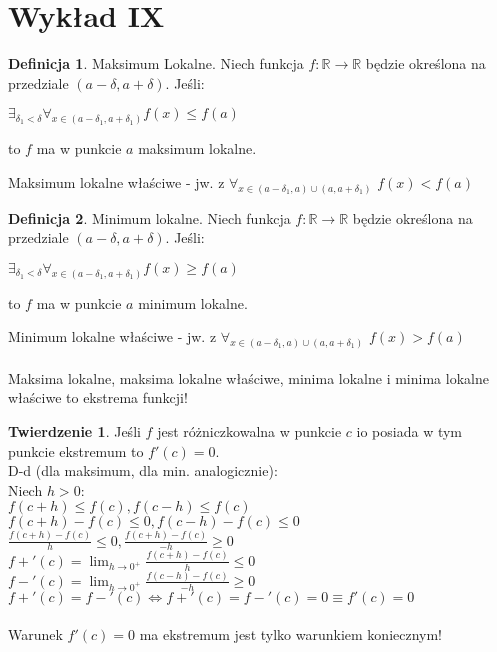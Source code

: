 \documentclass{article}
\theoremstyle{definition}
\newtheorem{de}{Definicja}[subsection]
\theoremstyle{definition}
\newtheorem{tw}{Twierdzenie}[subsection]
\theoremstyle{definition}
\theoremstyle{definition}
\begin{document}
\section{Wykład IX}

\begin{de}
Maksimum Lokalne. Niech funkcja $f:\mathbb{R}\rightarrow\mathbb{R}$ będzie określona na przedziale $(a-\delta,a+\delta)$.
Jeśli:
\begin{center}
    $\exists_{\delta_1 < \delta} \forall_{x\in(a-\delta_1,a + \delta_1)} f(x)\leq f(a)$
\end{center} to $f$  ma w punkcie $a$ maksimum lokalne.
\end{de}
Maksimum lokalne właściwe - jw. z $\forall_{x\in (a-\delta_1, a)\cup(a,a+\delta_1)}$ $f(x)<f(a)$

\begin{de}
Minimum lokalne. Niech funkcja $f:\mathbb{R}\rightarrow\mathbb{R}$ będzie określona na przedziale $(a-\delta,a+\delta)$.
Jeśli:
\begin{center}
    $\exists_{\delta_1 < \delta} \forall_{x\in(a-\delta_1,a + \delta_1)} f(x)\geq f(a)$
\end{center} to $f$  ma w punkcie $a$ minimum lokalne.
\end{de}
Minimum lokalne właściwe - jw. z $\forall_{x\in (a-\delta_1, a)\cup(a,a+\delta_1)}$ $f(x)>f(a)$\\\\
Maksima lokalne, maksima lokalne właściwe, minima lokalne i minima lokalne właściwe to ekstrema funkcji!

\begin{tw}
Jeśli $f$ jest różniczkowalna w punkcie $c$ io posiada w tym punkcie ekstremum to $f'(c)=0$.\\
D-d (dla maksimum, dla min. analogicznie):\\
Niech $h>0$:\\
$f(c+h)\leq f(c), f(c-h)\leq f(c)$\\
$f(c+h)-f(c)\leq 0, f(c-h) - f(c) \leq 0$\\
$\frac{f(c+h)-f(c)}{h}\leq 0, \frac{f(c+h)-f(c)}{-h}\geq 0$\\
$f+'(c)=\lim_{h\rightarrow 0^+} \frac{f(c+h)-f(c)}{h}\leq 0$\\
$f-'(c)=\lim_{h\rightarrow 0^+} \frac{f(c-h)-f(c)}{-h}\geq 0$\\
$f+'(c)=f-'(c)\iff f+'(c)=f-'(c)=0 \equiv f'(c)=0$\\\\
Warunek $f'(c)=0$ ma ekstremum jest tylko warunkiem koniecznym!
\end{tw}
\end{document}
